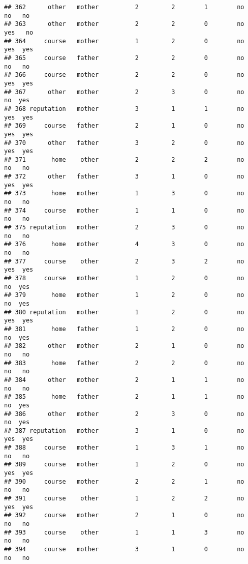 \documentclass[
]{article}
\begin{document}
\begin{verbatim}
## 362      other   mother          2         2        1        no     no   no
## 363      other   mother          2         2        0        no    yes   no
## 364     course   mother          1         2        0        no    yes  yes
## 365     course   father          2         2        0        no     no   no
## 366     course   mother          2         2        0        no    yes  yes
## 367      other   mother          2         3        0        no     no  yes
## 368 reputation   mother          3         1        1        no    yes  yes
## 369     course   father          2         1        0        no    yes  yes
## 370      other   father          3         2        0        no    yes  yes
## 371       home    other          2         2        2        no     no   no
## 372      other   father          3         1        0        no    yes  yes
## 373       home   mother          1         3        0        no     no   no
## 374     course   mother          1         1        0        no     no   no
## 375 reputation   mother          2         3        0        no     no   no
## 376       home   mother          4         3        0        no     no   no
## 377     course    other          2         3        2        no    yes  yes
## 378     course   mother          1         2        0        no     no  yes
## 379       home   mother          1         2        0        no     no  yes
## 380 reputation   mother          1         2        0        no    yes  yes
## 381       home   father          1         2        0        no     no  yes
## 382      other   mother          2         1        0        no     no   no
## 383       home   father          2         2        0        no     no   no
## 384      other   mother          2         1        1        no     no   no
## 385       home   father          2         1        1        no     no  yes
## 386      other   mother          2         3        0        no     no  yes
## 387 reputation   mother          3         1        0        no    yes  yes
## 388     course   mother          1         3        1        no     no   no
## 389     course   mother          1         2        0        no    yes  yes
## 390     course   mother          2         2        1        no     no   no
## 391     course    other          1         2        2        no    yes  yes
## 392     course   mother          2         1        0        no     no   no
## 393     course    other          1         1        3        no     no   no
## 394     course   mother          3         1        0        no     no   no

\end{verbatim}
\end{document}
